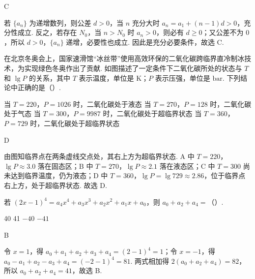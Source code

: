 \begin{answer}
C
\end{answer}

\begin{solution}
若 \(\{a_n\}\) 为递增数列，则公差 \(d>0\)，当 \(n\) 充分大时 \(a_n=a_1+(n-1)d>0\)，充分性成立. 反之，若存在 \(N_0\)，当 \(n>N_0\) 时 \(a_n>0\)，则必有 \(d\ge0\)；又公差不为 \(0\)，所以 \(d>0\)，\(\{a_n\}\) 递增，必要性也成立. 因此是充分必要条件，故选 C.
\end{solution}

\begin{problem}
在北京冬奥会上，国家速滑馆“冰丝带”使用高效环保的二氧化碳跨临界直冷制冰技术，为实现绿色冬奥作出了贡献. 如图描述了一定条件下二氧化碳所处的状态与 \(T\) 和 \(\lg P\) 的关系，其中 \(T\) 表示温度，单位是 \(\mathrm{K}\)；\(P\) 表示压强，单位是 \(\mathrm{bar}\). 下列结论中正确的是（\quad）.


\choices
    {当 \(T=220\)，\(P=1026\) 时，二氧化碳处于液态}
    {当 \(T=270\)，\(P=128\) 时，二氧化碳处于气态}
    {当 \(T=300\)，\(P=9987\) 时，二氧化碳处于超临界状态}
    {当 \(T=360\)，\(P=729\) 时，二氧化碳处于超临界状态}
\end{problem}

\begin{answer}
D
\end{answer}

\begin{solution}
由图知临界点在两条虚线交点处，其右上方为超临界状态. A 中 \(T=220\)，\(\lg P\approx3.0\) 落在固态区；B 中 \(T=270\)，\(\lg P\approx2.1\) 落在液态区；C 中 \(T=300\) 尚未达到临界温度，仍为液态；D 中 \(T=360\)，\(\lg P=\lg729\approx2.86\)，位于临界点右上方，处于超临界状态. 故选 D.
\end{solution}

\begin{problem}
若 \((2x-1)^4=a_4x^4+a_3x^3+a_2x^2+a_1x+a_0\)，则 \(a_0+a_2+a_4=\)（\quad）.

\choices
    {40}
    {41}
    {\(-40\)}
    {\(-41\)}
\end{problem}

\begin{answer}
B
\end{answer}

\begin{solution}
令 \(x=1\)，得 \(a_0+a_1+a_2+a_3+a_4=(2-1)^4=1\)；令 \(x=-1\)，得 \(a_0-a_1+a_2-a_3+a_4=(-2-1)^4=81\). 两式相加得 \(2(a_0+a_2+a_4)=82\)，所以 \(a_0+a_2+a_4=41\)，故选 B.
\end{solution}


